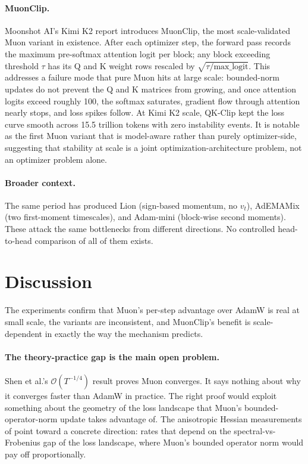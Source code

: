 \documentclass[11pt]{article}
\begin{document}
\paragraph{MuonClip.}
Moonshot AI's Kimi K2 report \citep{moonshot2025kimik2} introduces MuonClip, the most scale-validated Muon variant in existence. After each optimizer step, the forward pass records the maximum pre-softmax attention logit per block; any block exceeding threshold $\tau$ has its Q and K weight rows rescaled by $\sqrt{\tau/\mathrm{max\_logit}}$. This addresses a failure mode that pure Muon hits at large scale: bounded-norm updates do not prevent the Q and K matrices from growing, and once attention logits exceed roughly 100, the softmax saturates, gradient flow through attention nearly stops, and loss spikes follow. At Kimi K2 scale, QK-Clip kept the loss curve smooth across 15.5 trillion tokens with zero instability events. It is notable as the first Muon variant that is model-aware rather than purely optimizer-side, suggesting that stability at scale is a joint optimization-architecture problem, not an optimizer problem alone.

\paragraph{Broader context.}
The same period has produced Lion \citep{chen2023lion} (sign-based momentum, no $v_t$), AdEMAMix \citep{pagliardini2024ademamix} (two first-moment timescales), and Adam-mini \citep{zhang2024adammini} (block-wise second moments). These attack the same bottlenecks from different directions. No controlled head-to-head comparison of all of them exists.



\section{Discussion}
\label{sec:discussion}
\enlargethispage{2\baselineskip}

The experiments confirm that Muon's per-step advantage over AdamW is real at small scale, the variants are inconsistent, and MuonClip's benefit is scale-dependent in exactly the way the mechanism predicts.

\paragraph{The theory-practice gap is the main open problem.}
Shen et al.'s $\mathcal{O}(T^{-1/4})$ result proves Muon converges. It says nothing about why it converges faster than AdamW in practice. The right proof would exploit something about the geometry of the loss landscape that Muon's bounded-operator-norm update takes advantage of. The anisotropic Hessian measurements of \citet{dong2025quantifying} point toward a concrete direction: rates that depend on the spectral-vs-Frobenius gap of the loss landscape, where Muon's bounded operator norm would pay off proportionally.
\end{document}

